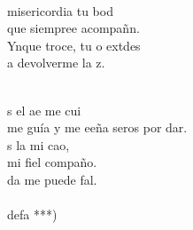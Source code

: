 \begin{cancion}
\begin{chorus}
	\end{chorus}%
	\jump\\
	misericordia tu bod\\
	 que siempree acompañn.  \\
	Ynque troce, tu o extdes\\
	a devolverme la z.\\\jump\\
	\begin{chorus}%
	s el ae me cui\\
	me guía y me eeña seros por dar.\\
	s la mi cao, \\
	mi fiel compaño.\\
	da me puede fal.   \\
\jump\\
	defa )\\
	\end{chorus}%
	\jump\\
\end{cancion}%
